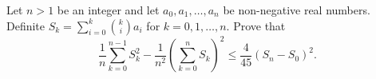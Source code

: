 Let $n>1$ be an integer and let $a_0,a_1,\ldots,a_n$ be non-negative real numbers. Definite $S_k=\sum_{i=0}^k \binom{k}{i}a_i$ for $k=0,1,\ldots,n$. Prove that\[\frac{1}{n} \sum_{k=0}^{n-1} S_k^2-\frac{1}{n^2}\left(\sum_{k=0}^{n} S_k\right)^2\le \frac{4}{45} (S_n-S_0)^2.\]